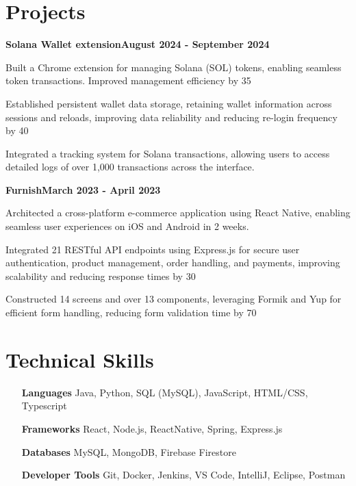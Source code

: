\documentclass[letterpaper,10pt]{article}
\newcommand{\heading}[2]{
  \hspace{10pt}#1\hfill#2\\
}
\newcommand{\headingBf}[2]{
  \heading{\textbf{#1}}{\textbf{#2}}
}
\newenvironment{resume_list}{
  \vspace{-7pt}
  \begin{itemize}[itemsep=-2px, parsep=1pt, leftmargin=30pt]
}{
  \end{itemize}
}
\begin{document}
  \section{Projects}
  \headingBf{Solana Wallet extension}{August 2024 - September 2024}
  \begin{resume_list}
    \item Built a Chrome extension for managing Solana (SOL) tokens, enabling seamless token transactions.  Improved management efficiency by 35%
    \item Established persistent wallet data storage, retaining wallet information across sessions and reloads, improving data reliability and reducing re-login frequency by 40%
    \item Integrated a tracking system for Solana transactions, allowing users to access detailed logs of over 1,000 transactions across the interface.
  \end{resume_list}
  \headingBf{Furnish}{March 2023 - April 2023}
  \begin{resume_list}
    \item Architected a cross-platform e-commerce application using React Native, enabling seamless user experiences on iOS and Android in 2 weeks.
    \item Integrated 21 RESTful API endpoints using Express.js for secure user authentication, product management, order handling, and payments, improving scalability and reducing response times by 30%
    \item Constructed 14 screens and over 13 components, leveraging Formik and Yup for efficient form handling, reducing form validation time by 70%
  \end{resume_list}
  \section{Technical Skills}
  \begin{multicols}{2}
    \begin{itemize}[itemsep=-2px, parsep=1pt, leftmargin=75pt]
      \item[\textbf{Languages}] Java, Python, SQL (MySQL), JavaScript, HTML/CSS, Typescript
      \item[\textbf{Frameworks}] React, Node.js, ReactNative, Spring, Express.js
      \item[\textbf{Databases}] MySQL, MongoDB, Firebase Firestore
      \item[\textbf{Developer Tools}] Git, Docker, Jenkins, VS Code, IntelliJ, Eclipse, Postman
    \end{itemize}
  \end{multicols}
\end{document}
